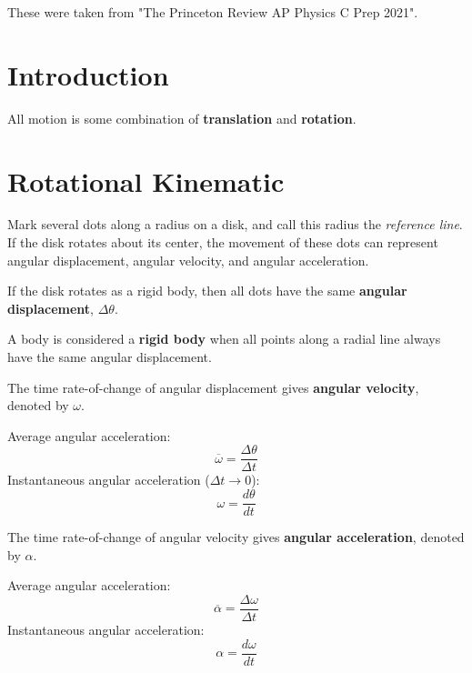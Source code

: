 \documentclass{article}
\begin{document}
\begin{note}
    These were taken from "The Princeton Review AP Physics C Prep 2021". 
\end{note}

\section{Introduction}
All motion is some combination of \textbf{translation} and \textbf{rotation}.

\section{Rotational Kinematic}
Mark several dots along a radius on a disk, and call this radius the \textit{reference line}. If the disk rotates about its center, the movement of these dots can represent angular displacement, angular velocity, and angular acceleration.

If the disk rotates as a rigid body, then all dots have the same \textbf{angular displacement}, $\Delta \theta$.
\begin{definition}
    A body is considered a \textbf{rigid body} when all points along a radial line always have the same angular displacement.
\end{definition}

\begin{definition}
    The time rate-of-change of angular displacement gives \textbf{angular velocity}, denoted by $\omega$.
    
    Average angular acceleration:
    \begin{equation*}
        \overline{\omega} = \frac{\Delta \theta}{\Delta t}
    \end{equation*}
    Instantaneous angular acceleration ($\Delta t \rightarrow 0$): 
    \begin{equation*}
        \omega = \frac{d\theta}{dt}
    \end{equation*}
\end{definition}

\begin{definition}
    The time rate-of-change of angular velocity gives \textbf{angular acceleration}, denoted by $\alpha$.

    Average angular acceleration:
    \begin{equation*}
        \overline{\alpha} = \frac{\Delta \omega}{\Delta t}
    \end{equation*}
    Instantaneous angular acceleration:
    \begin{equation*}
        \alpha = \frac{d\omega}{dt}
    \end{equation*}
\end{definition}
\end{document}
